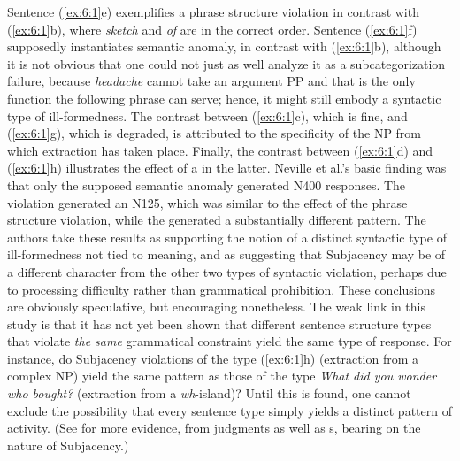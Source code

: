  \noindent
 Sentence (\ref{ex:6:1}e) exemplifies a phrase structure violation in contrast with (\ref{ex:6:1}b), where
 \textit{sketch} and \textit{of} are in the correct order. Sentence (\ref{ex:6:1}f)
 supposedly
 instantiates semantic anomaly, in contrast with (\ref{ex:6:1}b), although it is not obvious that one could not just as well analyze it as a subcategorization failure, because \textit{headache} cannot take an argument PP and that is the only function the following phrase can serve; hence, it might still embody a syntactic type of ill-formedness. The contrast between  (\ref{ex:6:1}c), which  is fine,  and  (\ref{ex:6:1}g), which  is degraded,  is attributed  to  the specificity of the NP from which extraction has taken place. Finally, the contrast between (\ref{ex:6:1}d) and (\ref{ex:6:1}h) illustrates the effect of a  in the latter. Neville et al.'s basic finding was that only the supposed semantic anomaly generated N400 responses. The   violation generated an N125, which was similar to the effect of the phrase structure violation, while the  generated a substantially different pattern. The authors take these results
 as supporting the notion of a distinct syntactic type of ill-formedness not tied to meaning, and as suggesting that Subjacency may be of a different character from the other two types of syntactic violation, perhaps due to processing difficulty rather than grammatical prohibition. These conclusions are obviously speculative, but encouraging nonetheless. The weak link in this study is that it has not yet been shown that different sentence structure types that violate \textit{the same} grammatical constraint yield the same type of  response. For instance, do Subjacency violations of the type (\ref{ex:6:1}h) (extraction from a complex NP) yield the same pattern as those of the type \textit{What did you wonder who bought?} (extraction from a \textit{wh}-island)? Until this is found, one cannot exclude the possibility that every sentence type simply yields a distinct pattern of activity. (See \citet{KluenderEtAl1993} for more evidence, from judgments as well as s, bearing on the nature of Subjacency.)

